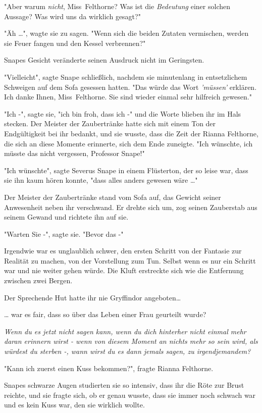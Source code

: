 {"Aber warum \emph{nicht}, Miss~Felthorne? Was ist die \emph{Bedeutung} einer solchen Aussage? Was wird uns da wirklich gesagt?"

"Äh …", wagte sie zu sagen. "Wenn sich die beiden Zutaten vermischen, werden sie Feuer fangen und den Kessel verbrennen?"

Snapes Gesicht veränderte seinen Ausdruck nicht im Geringsten.

"Vielleicht", sagte Snape schließlich, nachdem sie minutenlang in entsetzlichem Schweigen auf dem Sofa gesessen hatten. "Das würde das Wort \emph{'müssen'} erklären. Ich danke Ihnen, Miss~Felthorne. Sie sind wieder einmal sehr hilfreich gewesen."

"Ich -", sagte sie, "ich bin froh, dass ich -" und die Worte blieben ihr im Hals stecken. Der Meister der Zaubertränke hatte sich mit einem Ton der Endgültigkeit bei ihr bedankt, und sie wusste, dass die Zeit der Rianna Felthorne, die sich an diese Momente erinnerte, sich dem Ende zuneigte. "Ich wünschte, ich müsste das nicht vergessen, Professor Snape!"

"Ich wünschte", sagte Severus Snape in einem Flüsterton, der so leise war, dass sie ihn kaum hören konnte, "dass alles anders gewesen wäre …"

Der Meister der Zaubertränke stand vom Sofa auf, das Gewicht seiner Anwesenheit neben ihr verschwand. Er drehte sich um, zog seinen Zauberstab aus seinem Gewand und richtete ihn auf sie.

"Warten Sie -", sagte sie. "Bevor das -"

Irgendwie war es unglaublich schwer, den ersten Schritt von der Fantasie zur Realität zu machen, von der Vorstellung zum Tun. Selbst wenn es nur ein Schritt war und nie weiter gehen würde. Die Kluft erstreckte sich wie die Entfernung zwischen zwei Bergen.

Der Sprechende Hut hatte ihr nie Gryffindor angeboten…

… war es fair, dass so über das Leben einer Frau geurteilt wurde?

\emph{\emph{Wenn} \emph{du} \emph{es jetzt nicht sagen kann, wenn} \emph{du dich hinterher nicht einmal mehr daran erinnern wirst} \emph{- wenn von diesem Moment an nichts mehr so sein wird, als würdest du} \emph{sterben -, wann wirst du} \emph{es dann jemals sagen, zu irgendjemandem?}}

"Kann ich zuerst einen Kuss bekommen?", fragte Rianna Felthorne.

Snapes schwarze Augen studierten sie so intensiv, dass ihr die Röte zur Brust reichte, und sie fragte sich, ob er genau wusste, dass sie immer noch schwach war und es kein Kuss war, den sie wirklich wollte.

}
